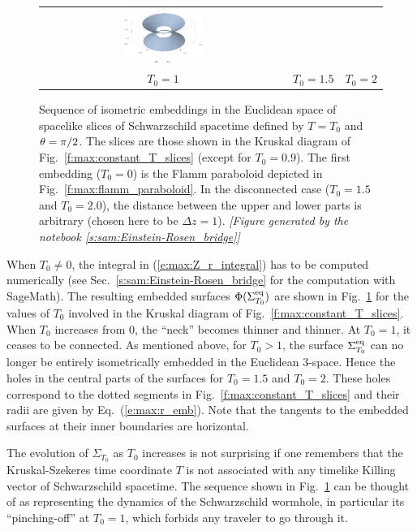 \begin{figure}
\begin{center}
\begin{tabular}{ccc}
\includegraphics[width=0.33\textwidth]{max_embedding_T0_20.png} \\
$T_0=1$ & $T_0=1.5$ & $T_0=2$
\end{tabular}
\end{center}
\caption[]{\label{f:max:embeddings} \footnotesize
Sequence of isometric embeddings in the Euclidean space
of spacelike slices of Schwarzschild spacetime defined by
$T=T_0$ and $\theta=\pi/2$. The slices are those shown in the Kruskal diagram
of Fig.~\ref{f:max:constant_T_slices} (except for $T_0=0.9$).
The first embedding ($T_0=0$) is the
Flamm paraboloid depicted in Fig.~\ref{f:max:flamm_paraboloid}.
In the disconnected case ($T_0=1.5$ and $T_0=2.0$),
the distance
between the upper and lower parts is arbitrary (chosen here to be $\Delta z = 1$).
\textsl{[Figure generated by the notebook \ref{s:sam:Einstein-Rosen_bridge}]}
}
\end{figure}

When $T_0\not=0$, the integral in (\ref{e:max:Z_r_integral}) has to
be computed numerically (see Sec.~\ref{s:sam:Einstein-Rosen_bridge} for the computation with SageMath).
The resulting embedded surfaces $\Phi(\Sigma_{T_0}^{\rm eq})$ are shown in
Fig.~\ref{f:max:embeddings} for the values of $T_0$ involved in the
Kruskal diagram of Fig.~\ref{f:max:constant_T_slices}.
When $T_0$ increases from $0$, the ``neck'' becomes thinner and thinner.
At $T_0=1$, it ceases to be connected. As mentioned above, for $T_0 > 1$,
the surface $\Sigma_{T_0}^{\rm eq}$ can no longer be entirely
isometrically embedded in the Euclidean 3-space. Hence the holes in the central
parts of the surfaces for $T_0=1.5$ and $T_0=2$. These holes correspond
to the dotted segments in Fig.~\ref{f:max:constant_T_slices} and their radii
are given by Eq.~(\ref{e:max:r_emb}). Note that the tangents to the
embedded surfaces at their inner boundaries are horizontal.

The evolution of $\Sigma_{T_0}$ as $T_0$ increases is not surprising if one
remembers that the Kruskal-Szekeres time coordinate $T$ is not associated
with any timelike Killing vector of Schwarzschild spacetime.
The sequence shown in Fig.~\ref{f:max:embeddings} can be thought of as
representing the dynamics of the Schwarzschild wormhole, in particular
its ``pinching-off'' at $T_0=1$, which forbids any traveler to go through it.

